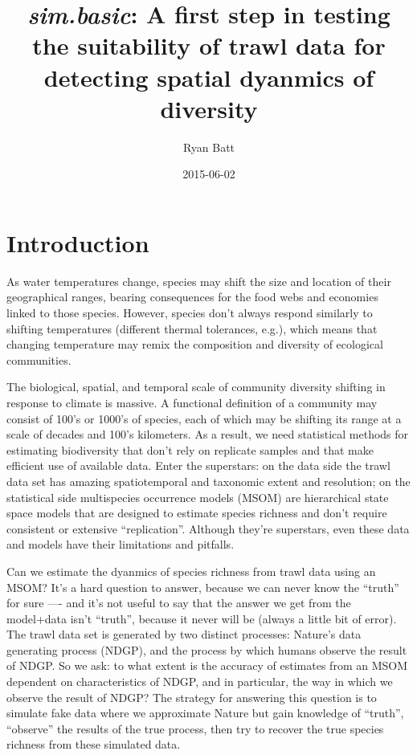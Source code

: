 \documentclass{article}\usepackage[]{graphicx}\usepackage[]{color}
\begin{document}



\title{\textbf{\emph{sim.basic}: A first step in testing the suitability of trawl data for detecting spatial dyanmics of diversity}}
\author{Ryan Batt}
\date{2015-06-02}
\maketitle



\section{Introduction}

As water temperatures change, species may shift the size and location of their geographical ranges, bearing consequences for the food webs and economies linked to those species. However, species don't always respond similarly to shifting temperatures (different thermal tolerances, e.g.), which means that changing temperature may remix the composition and diversity of ecological communities.

\par
The biological, spatial, and temporal scale of community diversity shifting in response to climate is massive. A functional definition of a community may consist of 100's or 1000's of species, each of which may be shifting its range at a scale of decades and 100's kilometers. As a result, we need statistical methods for estimating biodiversity that don't rely on replicate samples and that make efficient use of available data. Enter the superstars: on the data side the trawl data set has amazing spatiotemporal and taxonomic extent and resolution; on the statistical side multispecies occurrence models (MSOM) are hierarchical state space models that are designed to estimate species richness and don't require consistent or extensive ``replication''. Although they're superstars, even these data and models have their limitations and pitfalls.

\par
Can we estimate the dyanmics of species richness from trawl data using an MSOM? It's a hard question to answer, because we can never know the ``truth'' for sure ---- and it's not useful to say that the answer we get from the model+data isn't ``truth'', because it never will be (always a little bit of error). The trawl data set is generated by two distinct processes: Nature's data generating process (NDGP), and the process by which humans observe the result of NDGP. So we ask: to what extent is the accuracy of estimates from an MSOM dependent on characteristics of NDGP, and in particular, the way in which we observe the result of NDGP? The strategy for answering this question is to simulate fake data where we approximate Nature but gain knowledge of ``truth'', ``observe'' the results of the true process, then try to recover the true species richness from these simulated data.
\end{document}
